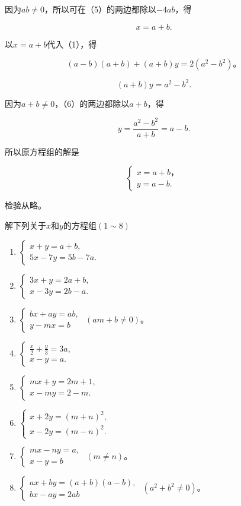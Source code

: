 因为\(ab \neq 0\)，所以可在（5）的两边都除以\(-4ab\)，得

\[
x = a + b.
\]

以\(x = a + b\)代入（1），得

\[
(a - b) (a + b) + (a + b) y = 2 (a ^ {2} - b ^ {2})\text{。}
\]

\[
(a + b) y = a ^ {2} - b ^ {2}. \tag{6}
\]

因为\(a + b \neq 0\)，（6）的两边都除以\(a + b\)，得

\[
y = \frac{a ^ {2} - b ^ {2}}{a + b} = a - b.
\]

所以原方程组的解是

\[
\left\{ \begin{array}{l} x = a + b\text{，} \\ y = a - b. \end{array} \right.
\]

检验从略。

解下列关于\(x\)和\(y\)的方程组\((1\sim 8)\)

\begin{enumerate}[start=1]
\item
  \(\left\{ \begin{array}{l} x + y = a + b, \\ 5x - 7y = 5b - 7a. \end{array} \right.\)
\item
  \(\left\{ \begin{array}{l} 3x + y = 2a + b, \\ x - 3y = 2b - a. \end{array} \right.\)
\item
  \(\left\{ \begin{array}{l} bx + ay = ab, \\ y - mx = b \end{array} \right.\) \((am + b \neq 0)\)。
\item
  \(\left\{ \begin{array}{l} \frac{x}{2} + \frac{y}{3} = 3a, \\ x - y = a. \end{array} \right.\)
\item
  \(\left\{ \begin{array}{l} mx + y = 2m + 1, \\ x - my = 2 - m. \end{array} \right.\)
\item
  \(\left\{ \begin{array}{l} x + 2y = (m + n)^2, \\ x - 2y = (m - n)^2. \end{array} \right.\)
\item
  \(\left\{ \begin{array}{l} mx - ny = a, \\ x - y = b \end{array} \right.\) \((m \neq n)\)。
\item
  \(\left\{ \begin{array}{l} ax + by = (a + b)(a - b), \\ bx - ay = 2ab \end{array} \right.\) \((a^2 + b^2 \neq 0)\)。
\end{enumerate}

